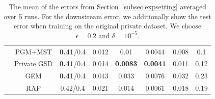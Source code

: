 \begin{table}[ht]
\begin{tabular}{cccccccc}
 & PGM+MST&\textbf{0.41}/0.4 & 0.012 & 0.01 & 0.0044 & 0.008 & 0.1 \\
 & Private GSD&\textbf{0.41}/0.4 & 0.014 & \textbf{0.0083} & \textbf{0.0041} & 0.011 & 0.12 \\
 & GEM&\textbf{0.41}/0.4 & 0.043 & 0.033 & 0.0076 & 0.032 & 0.23 \\
 & RAP&0.42/0.4 & 0.021 & 0.014 & 0.0061 & 0.018 & 0.19 \\
\bottomrule
\end{tabular}
 \caption{
    \small The mean of the errors from Section~\ref{subsec:expsetting}  averaged over 5 runs. For the downstream error, we additionally show the test error when training on the original private dataset. We choose $\epsilon =0.2$ and $\delta = 10^{-5}$.}
    \label{table_2}
    \end{table}







    

